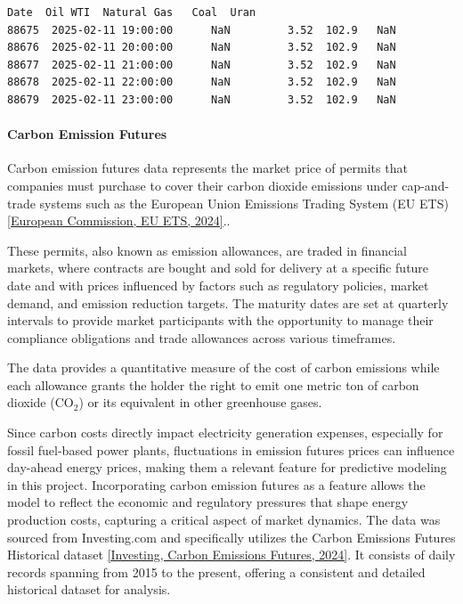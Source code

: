 \documentclass[a4paper]{article}
\begin{document}
    \begin{small}
\begin{Verbatim}[commandchars=\\\{\}]
                      Date  Oil WTI  Natural Gas   Coal  Uran
88675  2025-02-11 19:00:00      NaN         3.52  102.9   NaN
88676  2025-02-11 20:00:00      NaN         3.52  102.9   NaN
88677  2025-02-11 21:00:00      NaN         3.52  102.9   NaN
88678  2025-02-11 22:00:00      NaN         3.52  102.9   NaN
88679  2025-02-11 23:00:00      NaN         3.52  102.9   NaN
    \end{Verbatim}
\end{small}

    \paragraph{Carbon Emission Futures}\label{carbon-emission-futures}

Carbon emission futures data represents the market price of permits that
companies must purchase to cover their carbon dioxide emissions under
cap-and-trade systems such as the European Union Emissions Trading
System (EU ETS) \hyperref[bibliography]{[European Commission, EU ETS, 2024]}..

These permits, also known as emission allowances, are traded in
financial markets, where contracts are bought and sold for delivery at a
specific future date and with prices influenced by factors such as
regulatory policies, market demand, and emission reduction targets. The
maturity dates are set at quarterly intervals to provide market
participants with the opportunity to manage their compliance obligations
and trade allowances across various timeframes.

The data provides a quantitative measure of the cost of carbon emissions
while each allowance grants the holder the right to emit one metric ton
of carbon dioxide (CO$_{2}$) or its equivalent in other greenhouse gases.

Since carbon costs directly impact electricity generation expenses,
especially for fossil fuel-based power plants, fluctuations in emission
futures prices can influence day-ahead energy prices, making them a
relevant feature for predictive modeling in this project. Incorporating
carbon emission futures as a feature allows the model to reflect the
economic and regulatory pressures that shape energy production costs,
capturing a critical aspect of market dynamics. The data was sourced
from Investing.com and specifically utilizes the Carbon Emissions
Futures Historical dataset \hyperref[bibliography]{[Investing, Carbon Emissions Futures, 2024]}. It consists of daily records spanning from 2015 to the present,
offering a consistent and detailed historical dataset for analysis.
\end{document}
